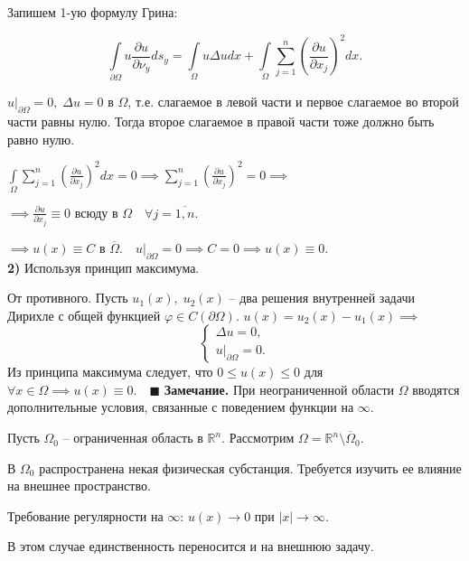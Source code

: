 Запишем 1-ую формулу Грина:

$$\int\limits_{\partial \Omega} u \frac{\partial u}{\partial \nu_y} ds_y = \int\limits_\Omega u \Delta u dx + \int\limits_\Omega \sum_{j=1}^n \left (\frac{\partial u}{\partial x_j} \right )^2 dx.$$

$u|_{\partial \Omega} = 0, \; \Delta u = 0$ в $\Omega$, т.е. слагаемое в левой части и первое слагаемое во второй части равны нулю. Тогда второе слагаемое в правой части тоже должно быть равно нулю.

$\int\limits_\Omega \sum_{j=1}^n \left (\frac{\partial u}{\partial x_j} \right )^2 dx = 0 \implies \sum_{j=1}^n \left (\frac{\partial u}{\partial x_j} \right )^2 = 0 \implies$

$\implies \frac{\partial u}{\partial x_j} \equiv 0 \text{ всюду в } \Omega \quad \forall j = \overline{1,n}.$

$\implies u(x) \equiv C$ в $\overline{\Omega}.\quad u|_{\partial \Omega} = 0 \implies C = 0 \implies u(x) \equiv 0$.\\

\textbf{2)} Используя принцип максимума.

От противного. Пусть $u_1(x), \; u_2(x)$ -- два решения внутренней задачи Дирихле с общей функцией $\varphi \in C(\partial \Omega)$. $u(x) = u_2(x) - u_1(x) \implies$
\begin{equation*}
    \begin{cases}
    \Delta u = 0, \\
    u |_{\partial \Omega} = 0.
    \end{cases}
\end{equation*}
Из принципа максимума следует, что $0 \leq u(x) \leq 0$ для $\forall x \in \Omega \implies u(x) \equiv 0. \quad \blacksquare$
\newline \newline
\textbf{Замечание.} При неограниченной области $\Omega$ вводятся дополнительные условия, связанные с поведением функции на $\infty$.

Пусть $\Omega_0$ -- ограниченная область в $\mathbb{R}^n$. Рассмотрим $\Omega = \mathbb{R}^n \setminus \overline{\Omega}_0$.

В $\Omega_0$ распространена некая физическая субстанция. Требуется изучить ее влияние на внешнее пространство.

Требование регулярности на $\infty$: $u(x) \rightarrow 0$ при $|x| \rightarrow \infty$.

В этом случае единственность переносится и на внешнюю задачу.


